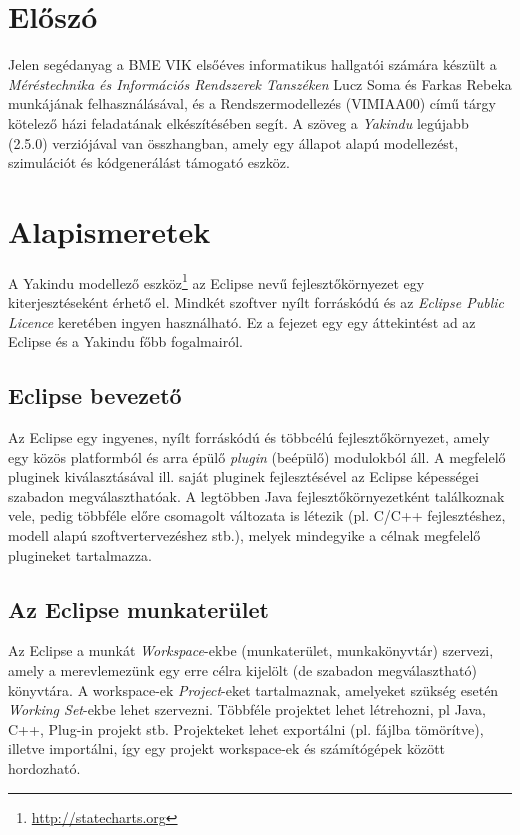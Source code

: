 
\graphicspath{ {./hf/figures/} }

\section{Előszó}

Jelen segédanyag a BME VIK elsőéves informatikus hallgatói számára készült a \emph{Méréstechnika és Információs Rendszerek Tanszéken} Lucz Soma és Farkas Rebeka munkájának felhasználásával, és a Rendszermodellezés (VIMIAA00) című tárgy kötelező házi feladatának elkészítésében segít. A szöveg a \emph{Yakindu} legújabb (2.5.0) verziójával van összhangban, amely egy állapot alapú modellezést, szimulációt és kódgenerálást támogató eszköz.


\section{Alapismeretek}

A Yakindu modellező eszköz\footnote{\url{http://statecharts.org}} az Eclipse nevű fejlesztőkörnyezet egy kiterjesztéseként érhető el. Mindkét szoftver nyílt forráskódú és az \emph{Eclipse Public Licence} keretében ingyen használható. Ez a fejezet egy egy áttekintést ad az Eclipse és a Yakindu főbb fogalmairól.

\subsection{Eclipse bevezető}

Az Eclipse egy ingyenes, nyílt forráskódú és többcélú fejlesztőkörnyezet, amely egy közös platformból és arra épülő \emph{plugin} (beépülő) modulokból áll. A megfelelő pluginek kiválasztásával ill. saját pluginek fejlesztésével az Eclipse képességei szabadon megválaszthatóak. A legtöbben Java fejlesztőkörnyezetként találkoznak vele, pedig többféle előre csomagolt változata is létezik (pl. C/C++ fejlesztéshez, modell alapú szoftvertervezéshez stb.), melyek mindegyike a célnak megfelelő plugineket tartalmazza.

\subsection{Az Eclipse munkaterület}

Az Eclipse a munkát \emph{Workspace}-ekbe (munkaterület, munkakönyvtár) szervezi, amely a merevlemezünk egy erre célra kijelölt (de szabadon megválasztható) könyvtára. A workspace-ek \emph{Project}-eket tartalmaznak, amelyeket szükség esetén \emph{Working Set}-ekbe lehet szervezni. Többféle projektet lehet létrehozni, pl Java, C++, Plug-in projekt stb. Projekteket lehet exportálni (pl.  fájlba tömörítve), illetve importálni, így egy projekt workspace-ek és számítógépek között hordozható.

